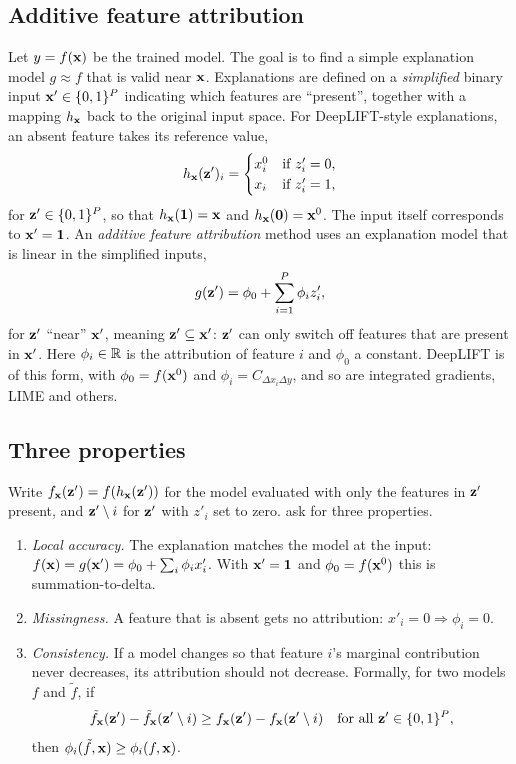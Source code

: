 \subsection{Additive feature attribution}

Let $y=f(\mathbf{x})$ be the trained model. The goal is to find a simple explanation model $g\approx f$ that is valid near $\mathbf{x}$. Explanations are defined on a \emph{simplified} binary input $\mathbf{x}'\in\{0,1\}^P$ indicating which features are ``present'', together with a mapping $h_{\mathbf{x}}$ back to the original input space. For DeepLIFT-style explanations, an absent feature takes its reference value,
\begin{equation}
  h_{\mathbf{x}}(\mathbf{z}')_i = \begin{cases} x_i^0 & \text{if } z'_i=0,\\ x_i & \text{if } z'_i=1,\end{cases}
\end{equation}
for $\mathbf{z}'\in\{0,1\}^P$, so that $h_{\mathbf{x}}(\mathbf{1})=\mathbf{x}$ and $h_{\mathbf{x}}(\mathbf{0})=\mathbf{x}^0$. The input itself corresponds to $\mathbf{x}'=\mathbf{1}$. An \emph{additive feature attribution} method uses an explanation model that is linear in the simplified inputs,
\begin{equation}
  g(\mathbf{z}') = \phi_0 + \sum_{i=1}^P\phi_i z'_i ,
  \label{eq:additive}
\end{equation}
for $\mathbf{z}'$ ``near'' $\mathbf{x}'$, meaning $\mathbf{z}'\subseteq\mathbf{x}'$: $\mathbf{z}'$ can only switch off features that are present in $\mathbf{x}'$. Here $\phi_i\in\mathbb{R}$ is the attribution of feature $i$ and $\phi_0$ a constant. DeepLIFT is of this form, with $\phi_0=f(\mathbf{x}^0)$ and $\phi_i=C_{\Delta x_i\Delta y}$, and so are integrated gradients, LIME and others.

\subsection{Three properties}

Write $f_{\mathbf{x}}(\mathbf{z}')=f(h_{\mathbf{x}}(\mathbf{z}'))$ for the model evaluated with only the features in $\mathbf{z}'$ present, and $\mathbf{z}'\setminus i$ for $\mathbf{z}'$ with $z'_i$ set to zero. \citet{lundberg2017} ask for three properties.
\begin{enumerate}
  \item \emph{Local accuracy.} The explanation matches the model at the input: $f(\mathbf{x})=g(\mathbf{x}')=\phi_0+\sum_i\phi_i x'_i$. With $\mathbf{x}'=\mathbf{1}$ and $\phi_0=f(\mathbf{x}^0)$ this is summation-to-delta.
  \item \emph{Missingness.} A feature that is absent gets no attribution: $x'_i=0\Rightarrow\phi_i=0$.
  \item \emph{Consistency.} If a model changes so that feature $i$'s marginal contribution never decreases, its attribution should not decrease. Formally, for two models $f$ and $\tilde f$, if
  \begin{equation}
    \tilde f_{\mathbf{x}}(\mathbf{z}')-\tilde f_{\mathbf{x}}(\mathbf{z}'\setminus i) \geq f_{\mathbf{x}}(\mathbf{z}')-f_{\mathbf{x}}(\mathbf{z}'\setminus i) \quad\text{for all } \mathbf{z}'\in\{0,1\}^P,
  \end{equation}
  then $\phi_i(\tilde f,\mathbf{x})\geq\phi_i(f,\mathbf{x})$.
\end{enumerate}

